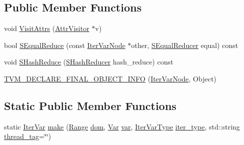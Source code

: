 \subsection*{Public Member Functions}
\begin{DoxyCompactItemize}
\item 
void \hyperlink{classtvm_1_1tir_1_1IterVarNode_adec9071918d696818dc32a6a00e02912}{Visit\+Attrs} (\hyperlink{classtvm_1_1AttrVisitor}{Attr\+Visitor} $\ast$v)
\item 
bool \hyperlink{classtvm_1_1tir_1_1IterVarNode_a3b209909dba431abf8e3227bdb1d9264}{S\+Equal\+Reduce} (const \hyperlink{classtvm_1_1tir_1_1IterVarNode}{Iter\+Var\+Node} $\ast$other, \hyperlink{classtvm_1_1SEqualReducer}{S\+Equal\+Reducer} equal) const 
\item 
void \hyperlink{classtvm_1_1tir_1_1IterVarNode_a9999c87753dd63f5ef156e661fb0b5e8}{S\+Hash\+Reduce} (\hyperlink{classtvm_1_1SHashReducer}{S\+Hash\+Reducer} hash\+\_\+reduce) const 
\item 
\hyperlink{classtvm_1_1tir_1_1IterVarNode_a361e7b4c3504acb0082e355441d4b66e}{T\+V\+M\+\_\+\+D\+E\+C\+L\+A\+R\+E\+\_\+\+F\+I\+N\+A\+L\+\_\+\+O\+B\+J\+E\+C\+T\+\_\+\+I\+N\+FO} (\hyperlink{classtvm_1_1tir_1_1IterVarNode}{Iter\+Var\+Node}, Object)
\end{DoxyCompactItemize}
\subsection*{Static Public Member Functions}
\begin{DoxyCompactItemize}
\item 
static \hyperlink{classtvm_1_1tir_1_1IterVar}{Iter\+Var} \hyperlink{classtvm_1_1tir_1_1IterVarNode_a28086abc1aa0a26a9c171c4bbc99a72e}{make} (\hyperlink{classtvm_1_1Range}{Range} \hyperlink{classtvm_1_1tir_1_1IterVarNode_acd6ca5f580e556a2d022e47900f9fe71}{dom}, \hyperlink{classtvm_1_1tir_1_1Var}{Var} \hyperlink{classtvm_1_1tir_1_1IterVarNode_a09036ef2df09e7caf21e66dcb62675a6}{var}, \hyperlink{namespacetvm_1_1tir_add7d0a6b1dd91f0c3c5dd2f4cf64358e}{Iter\+Var\+Type} \hyperlink{classtvm_1_1tir_1_1IterVarNode_af733200a8afd687584ffb8a52fb6a533}{iter\+\_\+type}, std\+::string \hyperlink{classtvm_1_1tir_1_1IterVarNode_a5557fabe09e48331422c89385cf45966}{thread\+\_\+tag}=\char`\"{}\char`\"{})
\end{DoxyCompactItemize}
